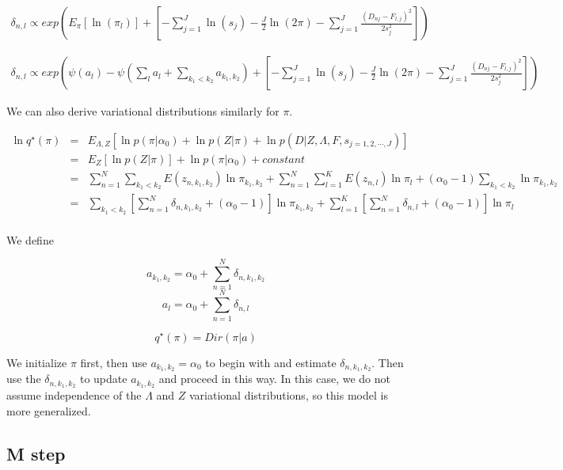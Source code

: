 \documentclass[11pt,authoryear]{article}
\begin{document}
\begin{multline}
\delta_{n, l} \propto exp \left (  E_{\pi} \left [ \ln (\pi_{l}) \right] +  \left [ - \sum_{j=1}^{J} \ln (s_j)  - \frac{J}{2} \ln (2 \pi) - \sum_{j=1}^{J} \frac{(D_{nj} - F_{l,j})^2}{2s^2_j} \right] \right ) 
\end{multline}

\begin{multline}
  \delta_{n, l} \propto exp \left ( \psi (a_{l}) - \psi(\sum_{l} a_{l} + \sum_{k_1 < k_2} a_{k_1, k_2}) + \left [ - \sum_{j=1}^{J} \ln (s_j)  - \frac{J}{2} \ln (2 \pi) -  \sum_{j=1}^{J} \frac{(D_{nj} - F_{l,j})^2}{2s^2_j} \right] \right ) 
\end{multline}

We can also derive variational distributions similarly for $\pi$.

\begin{eqnarray} \nonumber
\ln q^{\star} (\pi) &= & E_{\Lambda, Z} \left [ \ln p(\pi|\alpha_0)  + \ln p(Z | \pi) + \ln p(D | Z, \Lambda, F, s_{j=1,2,\cdots,J}) \right ] \\ \nonumber
  & = & E_{Z} \left [ \ln p(Z | \pi) \right] + \ln p(\pi | \alpha_0) + constant \\ \nonumber
  & = & \sum_{n=1}^{N}\sum_{k_1 < k_2} E(z_{n, k_1, k_2}) \ln \pi_{k_1,k_2} + \sum_{n=1}^{N}\sum_{l=1}^{K} E(z_{n, l}) \ln \pi_{l} +  (\alpha_0 -1) \sum_{k_1 < k_2} \ln \pi_{k_1,k_2} \\ \nonumber
  & = & \sum_{k_1 < k_2} \left [ \sum_{n=1}^{N} \delta_{n, k_1, k_2} + (\alpha_0 -1) \right] \ln \pi_{k_1, k_2} + \sum_{l=1}^{K} \left [ \sum_{n=1}^{N} \delta_{n, l} + (\alpha_0 -1) \right] \ln \pi_{l}  \\ \nonumber
\end{eqnarray}

We define 

$$ a_{k_1, k_2} = \alpha_0 + \sum_{n=1}^{N} \delta_{n, k_1, k_2} $$
$$ a_{l} = \alpha_0 + \sum_{n=1}^{N} \delta_{n, l} $$


$$ q^{\star} (\pi) = Dir(\pi | a)  $$


We initialize $\pi$  first, then use $a_{k_1,k_2}=\alpha_0$  to begin with and estimate $\delta_{n,k_1,k_2}$. Then use the $\delta_{n,k_1,k_2}$ to update $a_{k_1,k_2}$  and proceed in this way. In this case, we do not assume independence of the $\Lambda$ and $Z$ variational distributions, so this model is more generalized.

\subsection{M step}
\end{document}
